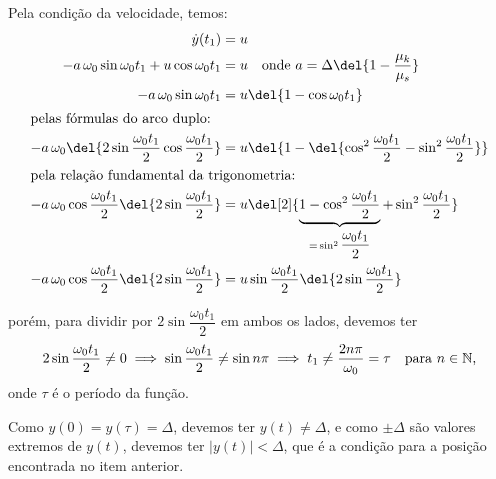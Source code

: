 \documentclass[]{IMTexam}
\begin{document}
\begin{questions}
\begin{parts}
		\begin{solution}
			Pela condição da velocidade, temos:
			\begin{align}
				\dot{y}(t_1)                                                            & =u\nonumber                                                                                                                          \\
				-a\,\omega_0\sin\omega_0t_1+u\cos\omega_0t_1                            & =u\quad\text{onde $ a=\Delta\del{1-\dfrac{\mu_k}{\mu_s}} $} \nonumber                                                                \\
				-a\,\omega_0\sin\omega_0t_1                                             & =u\del{1-\cos\omega_0t_1}\nonumber                                                                                                   \\
				\intertext{pelas fórmulas do arco duplo:}
				-a\,\omega_0\del{2\sin\dfrac{\omega_0t_1}{2}\cos\dfrac{\omega_0t_1}{2}} & =u\del{1-\del{\cos^{2}\dfrac{\omega_0t_1}{2}-\sin^{2}\dfrac{\omega_0t_1}{2}}}\nonumber                                               \\
				\intertext{pela relação fundamental da trigonometria:}
				-a\,\omega_0\cos\dfrac{\omega_0t_1}{2}\del{2\sin\dfrac{\omega_0t_1}{2}} & =u\del[2]{\underbrace{1-\cos^{2}\dfrac{\omega_0t_1}{2}}_{=\,\sin^{2}\dfrac{\omega_0t_1}{2}}+\sin^{2}\dfrac{\omega_0t_1}{2}}\nonumber \\
				-a\,\omega_0\cos\dfrac{\omega_0t_1}{2}\del{2\sin\dfrac{\omega_0t_1}{2}} & =u\sin\dfrac{\omega_0t_1}{2}\del{2\sin\dfrac{\omega_0t_1}{2}} \label{eq:t1par}
			\end{align}

			porém, para dividir por $ 2\sin\dfrac{\omega_0t_1}{2} $ em ambos os lados, devemos ter
			\[ 2\sin\dfrac{\omega_0t_1}{2}\neq 0\implies
				\sin\dfrac{\omega_0t_1}{2}\neq \sin n\pi \implies t_1\neq \dfrac{2n\pi}{\omega_0}=\tau\quad\text{para $ n\in\mathbb{N} $,} \]
			onde $ \tau $ é o período da função.

			Como $ y(0)=y(\tau)=\Delta $, devemos ter $ y(t)\neq\Delta $, e como $ \pm\Delta $ são valores extremos de $ y(t) $, devemos ter $ |y(t)|<\Delta $, que é a condição para a posição encontrada no item anterior.


\end{solution}
\end{parts}
\end{questions}
\end{document}
